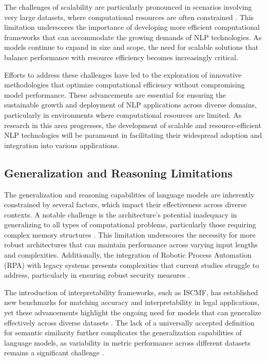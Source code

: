 The challenges of scalability are particularly pronounced in scenarios involving very large datasets, where computational resources are often constrained \cite{ling2021bayesiannetworkstructurelearning}. This limitation underscores the importance of developing more efficient computational frameworks that can accommodate the growing demands of NLP technologies. As models continue to expand in size and scope, the need for scalable solutions that balance performance with resource efficiency becomes increasingly critical.



Efforts to address these challenges have led to the exploration of innovative methodologies that optimize computational efficiency without compromising model performance. These advancements are essential for ensuring the sustainable growth and deployment of NLP applications across diverse domains, particularly in environments where computational resources are limited. As research in this area progresses, the development of scalable and resource-efficient NLP technologies will be paramount in facilitating their widespread adoption and integration into various applications.



\subsection{Generalization and Reasoning Limitations} \label{subsec:Generalization and Reasoning Limitations}

The generalization and reasoning capabilities of language models are inherently constrained by several factors, which impact their effectiveness across diverse contexts. A notable challenge is the architecture's potential inadequacy in generalizing to all types of computational problems, particularly those requiring complex memory structures \cite{stogin2022provablystableneuralnetwork}. This limitation underscores the necessity for more robust architectures that can maintain performance across varying input lengths and complexities. Additionally, the integration of Robotic Process Automation (RPA) with legacy systems presents complexities that current studies struggle to address, particularly in ensuring robust security measures \cite{pandy2024advancementsroboticsprocessautomation}.



The introduction of interpretability frameworks, such as ISCMF, has established new benchmarks for matching accuracy and interpretability in legal applications, yet these advancements highlight the ongoing need for models that can generalize effectively across diverse datasets \cite{lin2023interpretabilityframeworksimilarcase}. The lack of a universally accepted definition for semantic similarity further complicates the generalization capabilities of language models, as variability in metric performance across different datasets remains a significant challenge \cite{yamshchikov2020styletransferparaphraselookingsensible}.



